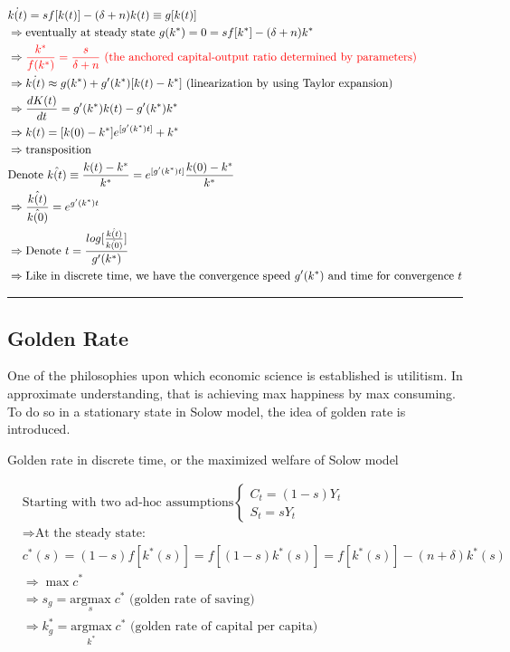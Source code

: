 \documentclass{article}
\newcommand*\sepline{%
  \begin{center}
    \rule[1ex]{.5\textwidth}{.5pt}
  \end{center}}
\begin{document}
\begin{align}
&\dot{k(t)}=sf[k(t)]-(\delta+n)k(t)\equiv g[k(t)]
\\&\Rightarrow \text{eventually at steady state }g(k^{*})=0=sf[k^{*}]-(\delta+n)k^{*} 
\\& \Rightarrow \color{red} \frac{k^{*}}{f(k^{*})}=\frac{s}{\delta+n} \text{ (the anchored capital-output ratio determined by parameters)}
\\& \Rightarrow \dot{k(t)} \approx g(k^{*})+g'(k^{*})[k(t)-k^{*}] \text{ (linearization by using Taylor expansion)}
\\&\Rightarrow \frac{dK(t)}{dt}=g'(k^{*})k(t)-g'(k^{*})k^{*}
\\&\Rightarrow k(t)=[k(0)-k^{*}] e^{[g'(k^{*})t]}+k^{*}
\\&\Rightarrow \text{transposition}
\\&\text{Denote }\hat{k(t)} \equiv \frac{k(t)-k^{*}}{k^{*}}=e^{[g'(k^{*})t]}\frac{k(0)-k^{*}}{k^{*}}
\\&\Rightarrow \frac{\hat{k(t)}}{\hat{k(0)}}=e^{g'(k^{*})t}
\\&\Rightarrow \text{Denote }t=\frac{log[\frac{\hat{k(t)}}{\hat{k(0)}}]}{g'(k^{*})}
\\&\Rightarrow \text{Like in discrete time, we have the convergence speed } g'(k^{*}) \text{ and time for convergence } t
\end{align}

\sepline
\subsection{Golden Rate}\label{golden-rate}

One of the philosophies upon which economic science is established is utilitism. In approximate understanding, that is achieving max happiness by max consuming. To do so in a stationary state in Solow model, the idea of golden rate is introduced.

Golden rate in discrete time, or the maximized welfare of Solow model 

\begin{align}
& \text{Starting with two ad-hoc assumptions}
\begin{cases}C_{t}=(1-s)Y_{t} \\
S_{t}=sY_{t} 
\end{cases}
\\&\Rightarrow\text{At the steady state:}
\\&c^{*}(s)=(1-s)f[k^{*}(s)]=f[(1-s)k^{*}(s)]=f[k^{*}(s)]-(n+\delta)k^{*}(s)
\\&\Rightarrow \max c^{*}
\\& \Rightarrow s_g=\underset{s}{\text{argmax}}\;c^* \text{ (golden rate of saving)}
\\& \Rightarrow k^*_g=\underset{k^*}{\text{argmax}}\;c^* \text{ (golden rate of capital per capita)}
\end{align}
\end{document}
